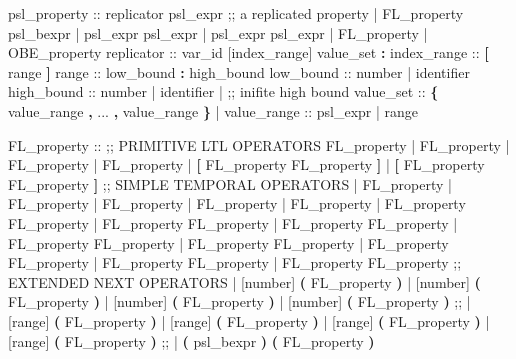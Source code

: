 \begin{Grammar}
psl_property :: 
   replicator psl_expr ;; a replicated property 
 | FL_property  psl_bexpr
 | psl_expr \operator{<->} psl_expr
 | psl_expr \operator{->} psl_expr
 | FL_property       
 | OBE_property      
replicator :: 
    var_id [index_range]  value_set \textbf{:} 
index_range :: 
   \textbf{[} range \textbf{]} 
range :: 
   low_bound \textbf{:} high_bound 
low_bound :: 
   number              
 | identifier         
high_bound :: 
   number 
 | identifier
 |              ;; inifite high bound 
value_set :: 
   \textbf{\{} value_range \textbf{,} ... \textbf{,} value_range \textbf{\}}
 | 
value_range :: 
   psl_expr
 | range
\end{Grammar}
%
\begin{Grammar}
FL_property ::
 ;; PRIMITIVE LTL OPERATORS
    FL_property                      
 |  FL_property                     
 |  FL_property                      
 |  FL_property                      
 | \textbf{[} FL_property  FL_property \textbf{]}  
 | \textbf{[} FL_property  FL_property \textbf{]}  
 ;; SIMPLE TEMPORAL OPERATORS
 |  FL_property                 
 |  FL_property                  
 |  FL_property                   
 |  FL_property                  
 |  FL_property            
 | FL_property  FL_property     
 | FL_property  FL_property      
 | FL_property  FL_property                                     
 | FL_property  FL_property     
 | FL_property  FL_property    
 | FL_property  FL_property     
 | FL_property  FL_property   
 | FL_property  FL_property    
 ;; EXTENDED NEXT OPERATORS
 |  [number] \textbf{(} FL_property \textbf{)}
 |  [number] \textbf{(} FL_property \textbf{)}                     
 |  [number] \textbf{(} FL_property \textbf{)}                   
 |  [number] \textbf{(} FL_property \textbf{)}                  
 ;;
 |  [range] \textbf{(} FL_property \textbf{)}
 |  [range] \textbf{(} FL_property \textbf{)}
 |  [range] \textbf{(} FL_property \textbf{)}
 |  [range] \textbf{(} FL_property \textbf{)}
 ;;
 |  \textbf{(} psl_bexpr \textbf{)} \textbf{(} FL_property \textbf{)}

\end{Grammar}
